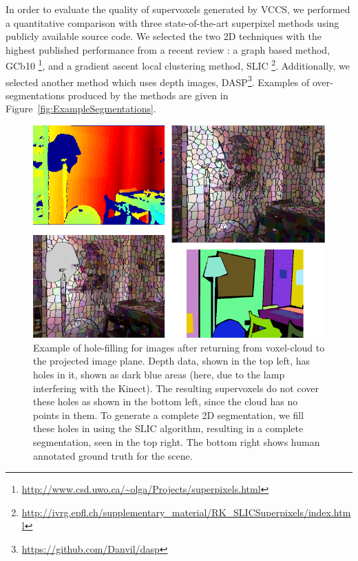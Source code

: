 \label{sec:Evaluation}
In order to evaluate the quality of supervoxels generated by VCCS, we performed a quantitative comparison with three state-of-the-art superpixel methods using publicly available source code. 
We selected the two 2D techniques with the highest published performance from a recent review \cite{SLICCompared}: a graph based method, GCb10 \cite{SuperpixelsSupervoxels}\footnote{\url{http://www.csd.uwo.ca/~olga/Projects/superpixels.html}}, and a gradient ascent local clustering method, SLIC \cite{SLICCompared}\footnote{\url{http://ivrg.epfl.ch/supplementary_material/RK_SLICSuperpixels/index.html}}.
Additionally, we selected another method which uses depth images, DASP\cite{DASP}\footnote{\url{https://github.com/Danvil/dasp}}.
Examples of over-segmentations produced by the methods are given in Figure~\ref{fig:ExampleSegmentations}.
\begin{figure}[t]
\begin{center}
\includegraphics[width=0.9\linewidth]{figures/CVPR2013/BackTo2D.pdf}
\end{center}
   \caption[2D Hole Filling]{Example of hole-filling for images after returning from voxel-cloud to the projected image plane. Depth data, shown in the top left, has holes in it, shown as dark blue areas (here, due to the lamp interfering with the Kinect). The resulting supervoxels do not cover these holes as shown in the bottom left, since the cloud has no points in them. To generate a complete 2D segmentation, we fill these holes in using the SLIC algorithm, resulting in a complete segmentation, seen in the top right. The bottom right shows human annotated ground truth for the scene. }
\label{fig:ReturnToPlane}
\end{figure}


